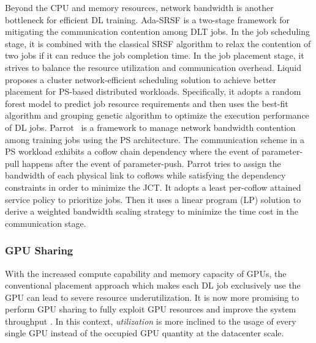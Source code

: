 Beyond the CPU and memory resources, network bandwidth is another bottleneck for efficient DL training. Ada-SRSF \cite{Ada-SRSF} is a two-stage framework for mitigating the communication contention among DLT jobs. In the job scheduling stage, it is combined with the classical SRSF algorithm to relax the contention of two jobs if it can reduce the job completion time. In the job placement stage, it strives to balance the resource utilization and communication overhead. Liquid \cite{Liquid} proposes a cluster network-efficient scheduling solution to achieve better placement for PS-based distributed workloads. Specifically, it adopts a random forest model to predict job resource requirements and then uses the best-fit algorithm and grouping genetic algorithm to optimize the execution performance of DL jobs. Parrot~\cite{Parrot} is a framework to manage network bandwidth contention among training jobs using the PS architecture. The communication scheme in a PS workload exhibits a coflow chain dependency where the event of parameter-pull happens after the event of parameter-push. Parrot tries to assign the bandwidth of each physical link to coflows while satisfying the dependency constraints in order to minimize the JCT. It adopts a least per-coflow attained service policy to prioritize jobs. Then it uses a linear program (LP) solution to derive a weighted bandwidth scaling strategy to minimize the time cost in the communication stage.



\subsubsection{GPU Sharing}

With the increased compute capability and memory capacity of GPUs, the conventional placement approach which makes each DL job exclusively use the GPU can lead to severe resource underutilization. It is now more promising to perform GPU sharing to fully exploit GPU resources and improve the system throughput {\tiny{}}. In this context, \emph{utilization} is more inclined to the usage of every single GPU instead of the occupied GPU quantity at the datacenter scale.

